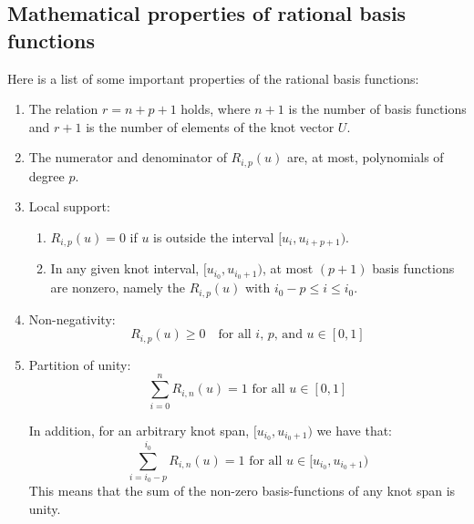 \subsection{Mathematical properties of rational basis functions}
Here is a list of some important properties of the rational basis functions:

\begin{enumerate}

    \item The relation $r = n + p + 1$ holds, where $n+1$ is the number of basis functions and $r+1$ is the number of elements of the knot vector $U$.

    \item The numerator and denominator of $R_{i,p}(u)$ are, at most, polynomials of degree $p$.

    \item Local support:
    \begin{enumerate}
        \item $R_{i,p}(u)=0$ if $u$ is outside the interval $[u_{i}, u_{i+p+1})$. 
        \item In any given knot interval, $[u_{i_{0}}, u_{i_{0}+1})$, at most $(p+1)$ basis functions are nonzero, namely the $R_{i,p}(u)$ with $i_{0}-p \leq i \leq i_{0}$.
    \end{enumerate}

    \item Non-negativity:
        \begin{equation*}
            R_{i,p}(u) \geq 0 \quad \text{for all $i$, $p$, and $u \in [0, 1]$}
        \end{equation*}
        
    \item Partition of unity:
        \begin{equation*}
            \sum_{i=0}^n R_{i,n}(u) = 1 \text{ for all } u \in [0, 1]
        \end{equation*}
    
    In addition, for an arbitrary knot span, $[u_{i_{0}}, u_{i_{0}+1})$ we have that:
        \begin{equation*}
            \sum_{i=i_{0}-p}^{i_{0}} R_{i,n}(u) = 1 \text{ for all } u \in [u_{i_{0}}, u_{i_{0}+1})
        \end{equation*}
    This means that the sum of the non-zero basis-functions of any knot span is unity.


\end{enumerate}
